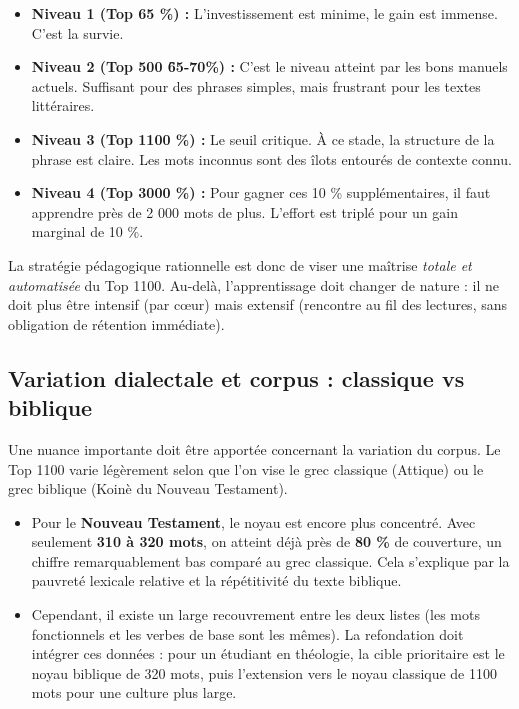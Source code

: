 {\begin{itemize}\item \textbf{Niveau 1 (Top 65 \%) :} L'investissement est minime, le gain est immense. C'est la survie.\item \textbf{Niveau 2 (Top 500 \- \~65-70\%) :} C'est le niveau atteint par les bons manuels actuels. Suffisant pour des phrases simples, mais frustrant pour les textes littéraires.\cite{III-1-1-ref8}\item \textbf{Niveau 3 (Top 1100 \%) :} Le seuil critique. À ce stade, la structure de la phrase est claire. Les mots inconnus sont des \og îlots\fg{} entourés de contexte connu.\item \textbf{Niveau 4 (Top 3000 \%) :} Pour gagner ces 10 \% supplémentaires, il faut apprendre près de 2 000 mots de plus. L'effort est triplé pour un gain marginal de 10 \%.\end{itemize}La stratégie pédagogique rationnelle est donc de viser une maîtrise \textit{totale et automatisée}
du Top 1100. Au-delà, l'apprentissage doit changer de nature : il ne doit plus être intensif (par
cœur) mais extensif (rencontre au fil des lectures, sans obligation de rétention
immédiate).\cite{III-1-1-ref9}



\subsection{Variation dialectale et corpus : classique vs biblique}

Une nuance importante doit être apportée concernant la variation du corpus. Le \og Top 1100\fg{}
varie légèrement selon que l'on vise le grec classique (Attique) ou le grec biblique (Koinè du
Nouveau Testament).

\begin{itemize}\item Pour le \textbf{Nouveau Testament}, le noyau est encore plus concentré. Avec seulement \textbf{310 à 320 mots}, on atteint déjà près de \textbf{80 \%} de couverture, un chiffre remarquablement bas comparé au grec classique.\cite{III-1-1-ref16} Cela s'explique par la pauvreté lexicale relative et la répétitivité du texte biblique.\item Cependant, il existe un large recouvrement entre les deux listes (les mots fonctionnels et les verbes de base sont les mêmes). La refondation doit intégrer ces données : pour un étudiant en théologie, la cible prioritaire est le noyau biblique de 320 mots, puis l'extension vers le noyau classique de 1100 mots pour une culture plus large.\cite{III-1-1-ref51}\end{itemize}

}
